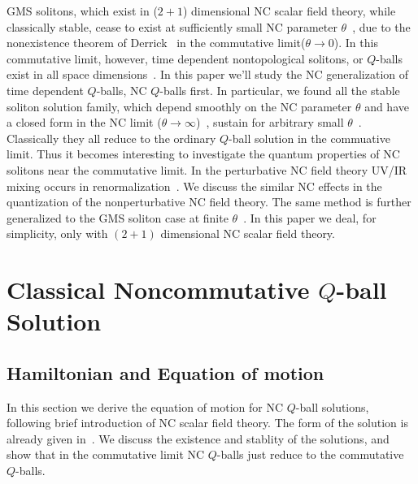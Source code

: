 \documentclass[a4paper,a4paper]{article}
\begin{document}
GMS solitons, which exist in ($2+1$)
dimensional NC scalar field theory, while classically stable, 
cease to exist at sufficiently small NC parameter $\theta$\ , due to the
nonexistence theorem of Derrick~\cite{Derrick} in the commutative
limit($\theta\rightarrow 0$).  In this commutative limit, however,
time dependent nontopological solitons, or $Q$-balls exist in all
space dimensions~\cite{LeeReport,Coleman}. 
In this paper we'll study the NC generalization of time dependent
$Q$-balls, NC $Q$-balls first. In particular, we found all the stable 
soliton solution
family, which depend smoothly on the NC parameter $\theta$ and have a
closed form in the NC limit ($\theta\rightarrow\infty$)~\cite{Dur},
sustain for arbitrary small $\theta$\ . Classically they
all reduce to the ordinary $Q$-ball solution in the commuative
limit. Thus it becomes interesting to investigate the  
quantum properties of NC solitons near the commutative limit. In the
perturbative NC field theory UV/IR mixing occurs in renormalization~\cite{MRS}. 
We discuss the similar NC effects in the quantization of the
nonperturbative NC field theory.  The same method is further generalized 
to the GMS soliton case at finite $\theta$\ . In this paper we deal, for
simplicity, only with $(2+1)$ dimensional NC scalar field theory.

\section{Classical Noncommutative $Q$-ball Solution}

\subsection{Hamiltonian and Equation of motion}

In this section we derive the equation of motion for NC $Q$-ball
solutions, following brief introduction of NC scalar field
theory. The form of the solution is already given in~\cite{NCQball}. 
We discuss the existence and stablity of the solutions,
and show that in the commutative limit NC $Q$-balls just reduce to the
commutative $Q$-balls. 
\end{document}
